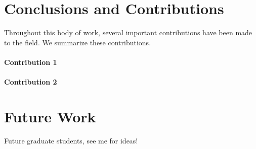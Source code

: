 \section{Conclusions and Contributions}
Throughout this body of work, several important contributions have been made to the field. We summarize these contributions.

\paragraph{Contribution 1}
\blindtext
\paragraph{Contribution 2}
\blindtext
\section{Future Work}
Future graduate students, see me for ideas!

